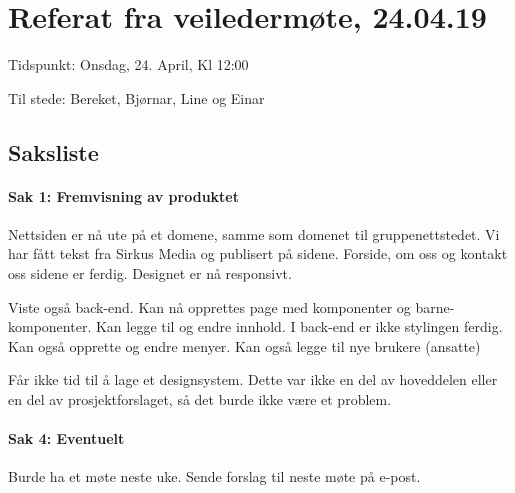 \chapter{Referat fra veiledermøte, 24.04.19}

Tidspunkt: Onsdag, 24. April, Kl 12:00

Til stede: Bereket, Bjørnar, Line og Einar

\section{Saksliste}

\subsubsection{Sak 1: Fremvisning av produktet}
Nettsiden er nå ute på et domene, samme som domenet til gruppenettstedet. Vi har fått tekst fra Sirkus Media og publisert på sidene.  Forside, om oss og kontakt oss sidene er ferdig. Designet er nå responsivt.

Viste også back-end. Kan nå opprettes page med komponenter og barne-komponenter. Kan legge til og endre innhold. I back-end er ikke stylingen ferdig. Kan også opprette og endre menyer. Kan også legge til nye brukere (ansatte)

Får ikke tid til å lage et designsystem. Dette var ikke en del av hoveddelen eller en del av prosjektforslaget, så det burde ikke være et problem.
 
\subsubsection{Sak 4: Eventuelt}
Burde ha et møte neste uke. Sende forslag til neste møte på e-post. 

